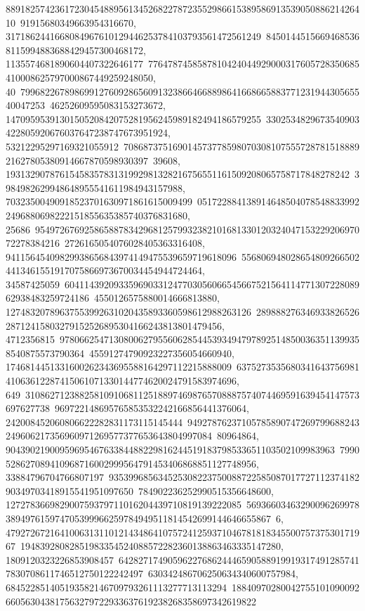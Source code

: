 {{{   88918257423617230454889561345268227872355298661538958691353905088621426410\
91915680349663954316670, 3171862441668084967610129446253784103793561472561249\
84501445156694685368115994883688429457300468172, 1135574681890604407322646177\
7764787458587810424044929000317605728350685410008625797000867449259248050, 40\
79968226789869912760928656091323866466889864166866588377123194430565540047253\
46252609595083153273672, 1470959539130150520842075281956245989182494186579255\
3302534829673540903422805920676037647238747673951924, 53212295297169321055912\
70868737516901457377859807030810755572878151888921627805380914667870598930397\
39608, 1931329078761545835783131992981328216756551161509208065758717848278242\
3984982629948648955541611984943157988, 70323500490918523701630971861615009499\
0517228841389146485040785488339922496880698222151855635385740376831680, 25686\
95497267692586588783429681257993238210168133012032404715322920697072278384216\
2726165054076028405363316408, 94115645409829938656843974149475539659719618096\
5568069480286548092665024413461551917075866973670034454944724464, 34587425059\
60411439209335969033124770305606654566752156411477130722808962938483259724186\
4550126575880014666813880, 12748320789637553992631020435893360598612988263126\
28988827634693382652628712415803279152526895304166243813801479456, 4712356815\
97806625471308006279556062854453934947978925148500363511399358540875573790364\
45591274790923227356054660940, 1746814451331600262343695588164297112215888009\
637527353568034164375698141063612287415061071330144774620024791583974696, 649\
31086271238825810910681125188974698765708887574074469591639454147573697627738\
969722148695765853532242166856441376064, 242008452060806622282831173115145444\
94927876237105785890747269799688243249606217356960971269577377653643804997084\
80964864, 9043902190095969546763384488229816244519183798533651103502109983963\
7990528627089410968716002999564791453406868851127748956, 33884796704766807197\
93539968563452530822375008872258508701772711237418290349703418915541951097650\
784902236252990515356648600, 127278366982900759379711016204439710819139222085\
56936603463290096269978389497615974705399966259784949511814542699144646655867\
6, 47927267216410063131101214348641075724125937104678181834550075737530171967\
19483928082851983354524088572282360138863463335147280, 1809120323226853908457\
64282717490596227686244465905889199193174912857417830708611746512750122242497\
630342486706250634340600757984, 684522851405193582146709793261113277713113294\
18840970280042755101090092660563043817563279722933637619238268358697342619822\
}}}
